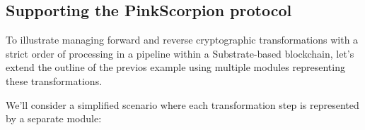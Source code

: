 \documentclass{tufte-handout}
\begin{document}
\subsection{Supporting the PinkScorpion protocol}\label{sec:headings}
To illustrate managing forward and reverse cryptographic transformations with a strict order of processing in a pipeline within a Substrate-based blockchain,
let's extend the outline of the previos example using multiple modules representing these transformations.

We'll consider a simplified scenario where each transformation step is represented by a separate module:
\end{document}
